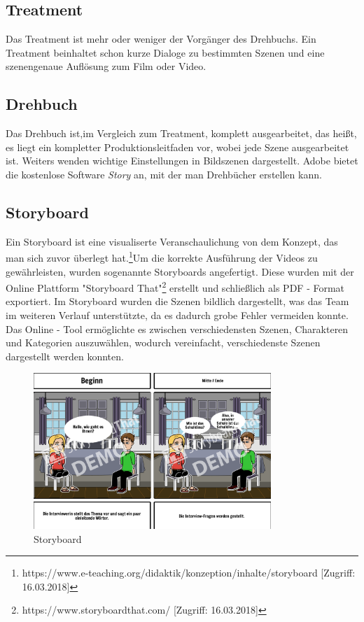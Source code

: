 \subsection{Treatment}
Das Treatment ist mehr oder weniger der Vorgänger des Drehbuchs. Ein Treatment beinhaltet schon kurze Dialoge zu bestimmten Szenen und eine szenengenaue Auflösung zum Film oder Video.
\subsection{Drehbuch}
Das Drehbuch ist,im Vergleich zum Treatment, komplett ausgearbeitet, das heißt, es liegt ein kompletter Produktionsleitfaden vor, wobei jede Szene ausgearbeitet ist. Weiters wenden wichtige Einstellungen in Bildszenen dargestellt. Adobe bietet die kostenlose Software \textit{Story} an, mit der man Drehbücher erstellen kann. 
\subsection{Storyboard}
Ein Storyboard ist eine visualiserte Veranschaulichung von dem Konzept, das man sich zuvor überlegt hat.\footnote{\label{foot:13}https://www.e-teaching.org/didaktik/konzeption/inhalte/storyboard [Zugriff: 16.03.2018]}Um die korrekte Ausführung der Videos zu gewährleisten, wurden sogenannte Storyboards angefertigt. Diese wurden mit der Online Plattform "Storyboard That"\footnote{\label{foot:14}https://www.storyboardthat.com/ [Zugriff: 16.03.2018]} erstellt und schließlich als PDF - Format exportiert.
Im Storyboard wurden die Szenen bildlich dargestellt, was das Team im weiteren Verlauf unterstützte, da es dadurch grobe Fehler vermeiden konnte.
Das Online - Tool ermöglichte es zwischen verschiedensten Szenen, Charakteren und Kategorien auszuwählen, wodurch vereinfacht, verschiedenste Szenen dargestellt werden konnten.
\begin{figure}[h]
	\centering
	\includegraphics[width=0.8\textwidth]{abb10} 
	\caption{Storyboard}
\end{figure}
